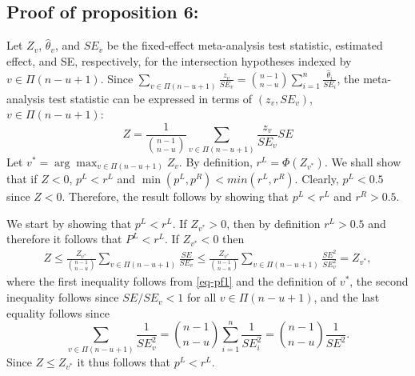 \documentclass[useAMS,usenatbib,referee]{biom}
\theoremstyle{plain}
\begin{document}
	
	
	
	
	
	\subsection*{Proof of proposition 6:}
	Let $Z_v$, $\hat \theta_v$, and $SE_v$ be the fixed-effect meta-analysis test statistic, estimated effect, and SE, respectively, for the intersection hypotheses indexed by $v\in \Pi(n-u+1)$.
	Since $\sum_{v\in \Pi(n-u+1)} \frac{z_v}{SE_v}  =\binom{n-1}{n-u}\sum_{i=1}^n\frac{\hat \theta_i}{SE_i}$, the meta-analysis test statistic can be expressed in terms of $(z_v, SE_v)$, $v\in \Pi(n-u+1)$:
	\begin{equation}
	Z = \frac1{\binom{n-1}{n-u}}\sum_{v\in \Pi(n-u+1)} \frac{z_v}{SE_v}SE \label{eq-pf1}
	\end{equation}
	Let $v^* = \arg \max_{v\in\Pi(n-u+1)} Z_v$. By definition,  $r^L = \Phi(Z_{v^{*}})$. We shall show that if $Z<0$, $p^L<r^L$ and $\min(p^L,p^R)< min(r^L,r^R)$. 
	Clearly, $p^L<0.5$ since 
	$Z<0$. Therefore, the result follows by showing that $p^L<r^L$ and $r^R>0.5$.   
	
	
	We start by showing that $p^L<r^L$.  If $Z_{v^*}>0$, then by definition $r^L>0.5$ and therefore  it follows that $P^L<r^L$.  If $Z_{v^*}<0$ then 
	\begin{eqnarray}
	Z\leq  \frac{Z_{v^*}}{\binom{n-1}{n-u}}\sum_{v\in \Pi(n-u+1)} \frac{SE}{SE_v}\leq  \frac{Z_{v^*}}{\binom{n-1}{n-u}}\sum_{v\in \Pi(n-u+1)} \frac{SE^2}{SE^2_v} = Z_{v^*}, \nonumber
	\end{eqnarray}
	where the first inequality follows from \eqref{eq-pf1} and the definition of $v^*$, the second inequality follows since $SE/SE_v<1$ for all $v\in\Pi(n-u+1)$, and the last equality follows since $$\sum_{v\in \Pi(n-u+1)} \frac{1}{SE^2_v}  =\binom{n-1}{n-u}\sum_{i=1}^n\frac{1}{SE^2_i}  = \binom{n-1}{n-u}\frac{1}{SE^2}. $$ 
	Since $Z\leq Z_{v^*}$ it thus follows that $p^L<r^L$. 
	
\end{document}
